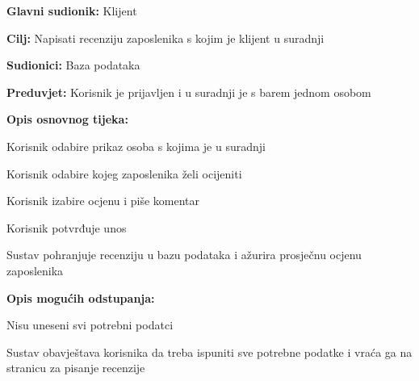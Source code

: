 					\noindent {}
					\begin{packed_item}
						
						\item \textbf{Glavni sudionik:} Klijent
						\item  \textbf{Cilj:} Napisati recenziju zaposlenika s kojim je klijent u suradnji
						\item  \textbf{Sudionici:} Baza podataka
						\item  \textbf{Preduvjet:} Korisnik je prijavljen i u suradnji je s barem jednom osobom
						\item  \textbf{Opis osnovnog tijeka:}
						
						\item[] \begin{packed_enum}
							
							\item Korisnik odabire prikaz osoba s kojima je u suradnji
							\item Korisnik odabire kojeg zaposlenika želi ocijeniti
							\item Korisnik izabire ocjenu i piše komentar
							\item Korisnik potvrđuje unos
							\item Sustav pohranjuje recenziju u bazu podataka i ažurira prosječnu ocjenu zaposlenika
							
						\end{packed_enum}
					
						\item  \textbf{Opis mogućih odstupanja:}
						
						\item[] \begin{packed_item}
							
							\item[4.a] Nisu uneseni svi potrebni podatci
							\item[] \begin{packed_enum}
								
								\item Sustav obavještava korisnika da treba ispuniti sve potrebne podatke i vraća ga na stranicu za pisanje recenzije
								
							\end{packed_enum}
							
						\end{packed_item}
						
						
					\end{packed_item}
			
